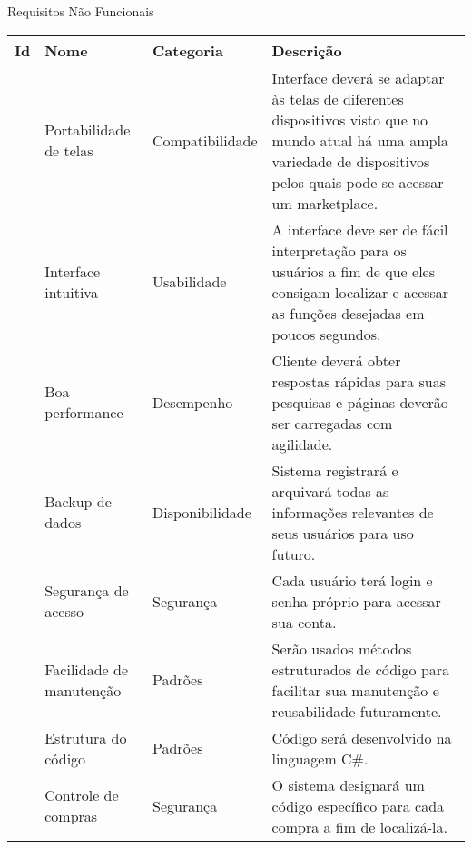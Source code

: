 \documentclass[
	12pt,				%
	openright,			%
	twoside,			%
	a4paper,			%
	english,			%
	brazil				%
	]{abntex2}
\begin{document}
\begin{quadro}[htb]
    \caption{\label{quadro_rnf}Requisitos Não Funcionais}
    \small %
    \begin{adjustbox}{center}
        \begin{tabular}{|p{1.5cm}|p{3.5cm}|p{3.5cm}|p{4.5cm}|}
            \hline
            \textbf{Id} & \textbf{Nome} & \textbf{Categoria} & \textbf{Descrição} \\ \hline
            [RNF001] & Portabilidade de telas & Compatibilidade & Interface deverá se adaptar às telas de diferentes dispositivos visto que no mundo atual há uma ampla variedade de dispositivos pelos quais pode-se acessar um marketplace. \\ \hline
            [RNF002] & Interface intuitiva & Usabilidade & A interface deve ser de fácil interpretação para os usuários a fim de que eles consigam localizar e acessar as funções desejadas em poucos segundos. \\ \hline
            [RNF003] & Boa performance & Desempenho & Cliente deverá obter respostas rápidas para suas pesquisas e páginas deverão ser carregadas com agilidade. \\ \hline
            [RNF004] & Backup de dados & Disponibilidade & Sistema registrará e arquivará todas as informações relevantes de seus usuários para uso futuro. \\ \hline
            [RNF005] & Segurança de acesso & Segurança & Cada usuário terá login e senha próprio para acessar sua conta. \\ \hline
            [RNF006] & Facilidade de manutenção & Padrões & Serão usados métodos estruturados de código para facilitar sua manutenção e reusabilidade futuramente. \\ \hline
            [RNF007] & Estrutura do código & Padrões & Código será desenvolvido na linguagem C\#. \\ \hline
            [RNF008] & Controle de compras & Segurança & O sistema designará um código específico para cada compra a fim de localizá-la. \\ \hline
        \end{tabular}
    \end{adjustbox}
\end{quadro}
\end{document}
